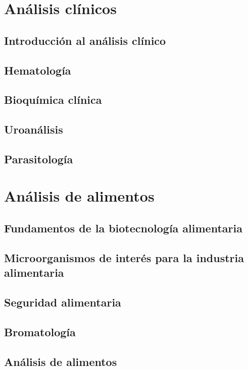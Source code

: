 \documentclass{../summarie}
\begin{document}
\Portada
\Indice
\fancystyle
\onehalfspacing


\part{Análisis clínicos}

    \chapter{Introducción al análisis clínico}
    \chapter{Hematología}
    \chapter{Bioquímica clínica}
    \chapter{Uroanálisis}
    \chapter{Parasitología}

\part{Análisis de alimentos}

    \chapter{Fundamentos de la biotecnología alimentaria}
    \chapter{Microorganismos de interés para la industria alimentaria}
    \chapter{Seguridad alimentaria}
    \chapter{Bromatología}
    \chapter{Análisis de alimentos}
\end{document}
